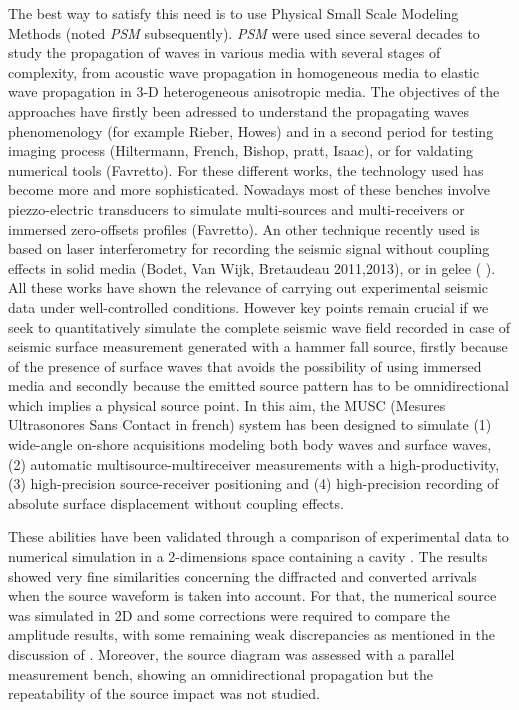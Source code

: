 \documentclass[manuscript,revised]{geophysics}
\newcommand{\psm}{\textit{PSM} }
\newcommand{\thrd}{3-D }
\begin{document}
\noindent The best way to satisfy this need is to use Physical Small Scale Modeling Methods (noted \psm subsequently). \psm were used since several decades to study the propagation of waves in various media with several stages of complexity, from acoustic wave propagation in homogeneous media to elastic wave propagation in \thrd heterogeneous anisotropic media. The objectives of the approaches have firstly been adressed to understand the propagating waves phenomenology (for example  Rieber, Howes) and in a second period for testing imaging process (Hiltermann, French, Bishop, pratt, Isaac), or for valdating numerical tools (Favretto). For these different works, the technology used has become more and more sophisticated. Nowadays most of these benches involve piezzo-electric transducers to simulate multi-sources and multi-receivers \citep{Wong_SPM_2009} or immersed zero-offsets profiles (Favretto). An other technique recently used is based on laser interferometry for recording the seismic signal without coupling effects in solid media (Bodet, Van Wijk, Bretaudeau 2011,2013), or in gelee ( ). All these works have shown the relevance of carrying out experimental seismic data under well-controlled conditions. However key points remain crucial if we seek to quantitatively simulate the complete seismic wave field recorded in case of seismic surface measurement generated with a hammer fall source, firstly because of the presence of surface waves that avoids the possibility of using immersed media and secondly because the emitted source pattern has to be omnidirectional which implies a physical source point. In this aim, the MUSC (Mesures Ultrasonores Sans Contact in french) system has been designed  \citep{Bretaudeau_SSM_2011} to simulate (1) wide-angle on-shore acquisitions modeling both body waves and surface waves, (2) automatic multisource-multireceiver measurements with a high-productivity, (3) high-precision source-receiver positioning and (4) high-precision recording of absolute surface displacement without coupling effects. 

\noindent These abilities have been validated through a comparison of experimental data to numerical simulation in a 2-dimensions space containing a cavity \citep{Bretaudeau_SSM_2011}. The results showed very fine similarities concerning the diffracted and converted arrivals when the source waveform is taken into account. For that, the numerical source was simulated in 2D and some corrections were required to compare the amplitude results, with some remaining weak discrepancies as mentioned in the discussion of \citet{Bretaudeau_SSM_2011}. Moreover, the source diagram was assessed with a parallel measurement bench, showing an omnidirectional propagation but the repeatability of the source impact was not studied.
\end{document}
